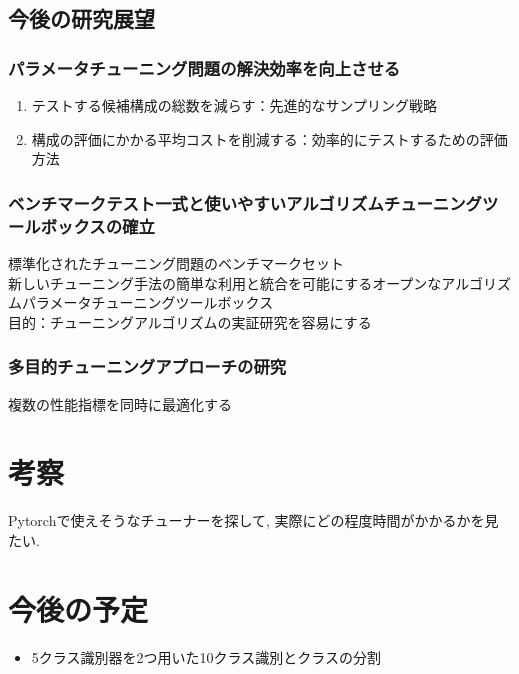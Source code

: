 \documentclass[twocolumn]{jarticle}     %
\begin{document}
\subsection{今後の研究展望}
\subsubsection{パラメータチューニング問題の解決効率を向上させる}
\begin{enumerate}
  \item テストする候補構成の総数を減らす：先進的なサンプリング戦略
  \item 構成の評価にかかる平均コストを削減する：効率的にテストするための評価方法
\end{enumerate}

\subsubsection{ベンチマークテスト一式と使いやすいアルゴリズムチューニングツールボックスの確立}
標準化されたチューニング問題のベンチマークセット\\
新しいチューニング手法の簡単な利用と統合を可能にするオープンなアルゴリズムパラメータチューニングツールボックス\\
目的：チューニングアルゴリズムの実証研究を容易にする

\subsubsection{多目的チューニングアプローチの研究}
複数の性能指標を同時に最適化する


\section{考察}
Pytorchで使えそうなチューナーを探して, 実際にどの程度時間がかかるかを見たい.


\section{今後の予定}
\begin{itemize}
	\item {5クラス識別器を2つ用いた10クラス識別とクラスの分割}
\end{itemize}



\end{document}
